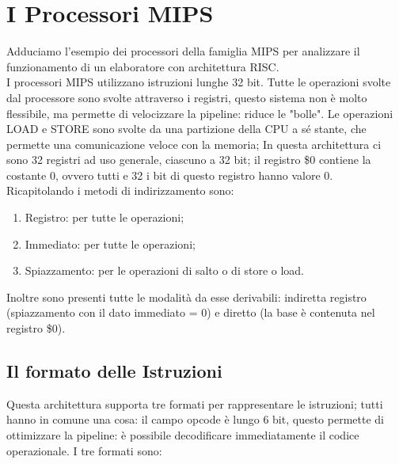 \documentclass{article}
\begin{document}
\section{I Processori MIPS}

Adduciamo l'esempio dei processori della famiglia MIPS per analizzare il funzionamento di un elaboratore con architettura RISC.\\
I processori MIPS utilizzano istruzioni lunghe 32 bit. Tutte le operazioni svolte dal processore sono svolte attraverso i registri, questo sistema non è molto flessibile, ma permette di velocizzare la pipeline: riduce le "bolle". Le operazioni LOAD e STORE sono svolte da una partizione della CPU a sé stante, che permette una comunicazione veloce con la memoria;
In questa architettura ci sono 32 registri ad uso generale, ciascuno a 32 bit; il registro \$0 contiene la costante 0, ovvero tutti e 32 i bit di questo registro hanno valore 0.\\
Ricapitolando i metodi di indirizzamento sono:
\begin{enumerate}
	\item Registro: per tutte le operazioni;

	\item Immediato: per tutte le operazioni;

	\item Spiazzamento: per le operazioni di salto o di store o load.
\end{enumerate}

Inoltre sono presenti tutte le modalità da esse derivabili: indiretta registro (spiazzamento con il dato immediato = 0) e diretto (la base è contenuta nel registro \$0).

\subsection{Il formato delle Istruzioni}

Questa architettura supporta tre formati per rappresentare le istruzioni; tutti hanno in comune una cosa: il campo opcode è lungo 6 bit, questo permette di ottimizzare la pipeline: è possibile decodificare immediatamente il codice operazionale. I tre formati sono:
\end{document}
